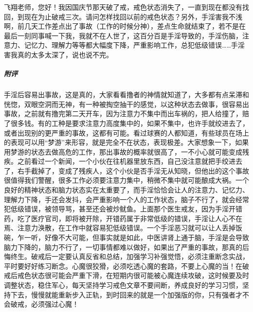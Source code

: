 \begin{case}
    飞翔老师，您好！我因国庆节那天破了戒，戒色状态消失了，一直到现在都没有找回，到现在为止破戒三次。请问怎样找回以前的戒色状态？另外，手淫害我不浅啊，前几天工作差点出了事故（工作的时候分神），差点生命就结束了，若不是在最后一刻同事喊一下我，我就不在人世了，这百分百是手淫导致的，手淫伤脑，注意力、记忆力、理解力等等都大幅度下降，严重影响工作，总犯低级错误……手淫害我真的太多太深了，说也说不完。
    \subparagraph{附评} 手淫后容易出事故，这是真的，大家看看撸者的神情就知道了，大多都有点呆滞和恍惚，双眼空洞而无神，有一种被掏空抽干的感觉，以这种状态去做事，很容易出事故，之前就有撸完第二天开车，因为注意力不集中而出车祸的，把人给撞了，赔了很多钱。有的工种是要求注意力高度集中的，如果不集中，也许手就绞进去了，或者出现别的更严重的事故，这都有可能。看过球赛的人都知道，有些球员在场上的表现可以用“梦游”来形容，就是完全不在状态，表现极差。大家想象一下，如果用梦游的状态去做高危的工作，那出事故的概率就很高了，一不小心就可能变成残疾。之前看过一个新闻，一个小伙在往机器里放东西，自己没注意就把手绞进去了，右手截掉了，变成了残疾人，这个小伙是否手淫无从知晓，但他出的这个事故很值得我们警醒，很多工作必须要注意力集中，稍微不集中就可能酿成大祸。一个良好的精神状态和脑力状态实在太重要了，而手淫恰恰会让人的注意力、记忆力、理解力下降，手还会发抖，会严重影响一个人的工作状态，脑子不行了，就会经常犯低级错误，被领导骂，甚至还会被炒鱿鱼。上面那个医生戒友，因为手淫开错药，吃了医疗官司，即将被开除，开错药属于非常低级的错误，手淫让人心不在焉、注意力涣散，在工作中就容易犯低级错误。一个手淫恶习就可以让人丢掉饭碗，乍一听，好像不大可能，但事实就是如此，中医讲肾上通于脑，手淫是会导致脑力下降的，脑力不行了，一切事情都难以做好，如果出了严重的事故，那真的后悔终生。破戒后一定要认真反省和总结，加强学习补强觉悟，必须注重断念实战，平时要好好练习断念。心魔很狡猾，必须吃透心魔的套路，不要上心魔的当！在破戒后戒色状态很可能会严重下滑，在短期内很可能被心魔连续攻破，这时候要及时调整状态，稳住军心，每天坚持学习戒色文章不要间断，养成良好的学习习惯，坚持下去，慢慢就能重新步入正轨，到时回来的就是一个加强版的你，只有强者才不会破戒，必须强过心魔！
\end{case}

